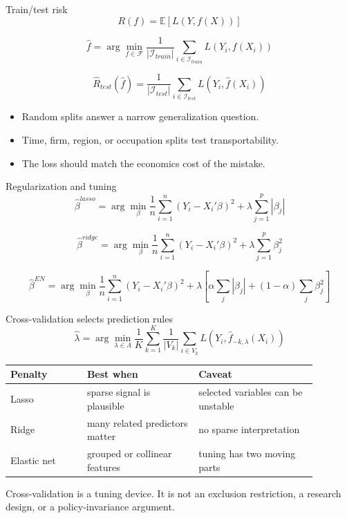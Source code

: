 \documentclass[aspectratio=169,11pt]{beamer}
\newcommand{\E}{\mathbb{E}}
\newcommand{\1}{\mathbf{1}}
\begin{document}
\begin{frame}{Train/test risk}
\small
\[
R(f)=\E\left[L(Y,f(X))\right]
\]

\[
\widehat f
=
\arg\min_{f\in\mathcal F}
\frac{1}{|\mathcal I_{train}|}
\sum_{i\in\mathcal I_{train}} L(Y_i,f(X_i))
\]

\[
\widehat R_{test}(\widehat f)
=
\frac{1}{|\mathcal I_{test}|}
\sum_{i\in\mathcal I_{test}} L(Y_i,\widehat f(X_i))
\]

\begin{itemize}
    \item Random splits answer a narrow generalization question.
    \item Time, firm, region, or occupation splits test transportability.
    \item The loss should match the economics cost of the mistake.
\end{itemize}
\end{frame}

\begin{frame}{Regularization and tuning}
\small
\[
\widehat\beta^{lasso}
=
\arg\min_{\beta}
\frac{1}{n}\sum_{i=1}^{n}(Y_i-X_i'\beta)^2
+
\lambda\sum_{j=1}^{p}|\beta_j|
\]

\[
\widehat\beta^{ridge}
=
\arg\min_{\beta}
\frac{1}{n}\sum_{i=1}^{n}(Y_i-X_i'\beta)^2
+
\lambda\sum_{j=1}^{p}\beta_j^2
\]

\[
\widehat\beta^{EN}
=
\arg\min_{\beta}
\frac{1}{n}\sum_{i=1}^{n}(Y_i-X_i'\beta)^2
+
\lambda\left[\alpha\sum_j|\beta_j|+(1-\alpha)\sum_j\beta_j^2\right]
\]
\end{frame}

\begin{frame}{Cross-validation selects prediction rules}
\small
\[
\widehat\lambda
=
\arg\min_{\lambda\in\Lambda}
\frac{1}{K}\sum_{k=1}^{K}
\frac{1}{|V_k|}
\sum_{i\in V_k}
L\left(Y_i,\widehat f_{-k,\lambda}(X_i)\right)
\]

\medskip
\begin{tabular}{p{0.22\linewidth} p{0.32\linewidth} p{0.34\linewidth}}
\toprule
Penalty & Best when & Caveat \\
\midrule
Lasso & sparse signal is plausible & selected variables can be unstable \\
Ridge & many related predictors matter & no sparse interpretation \\
Elastic net & grouped or collinear features & tuning has two moving parts \\
\bottomrule
\end{tabular}

\medskip
Cross-validation is a tuning device. It is not an exclusion restriction, a research design, or a policy-invariance argument.
\end{frame}
\end{document}
